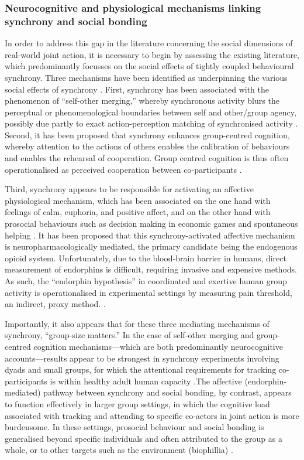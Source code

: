 \begin{CJK}{UTF8}{gbsn}
\subsubsection{Neurocognitive and physiological mechanisms linking synchrony and social bonding}
In order to address this gap in the literature concerning the social dimensions of real-world joint action, it is necessary to begin by assessing the existing literature, which predominantly focusses on the social effects of tightly coupled behavioural synchrony. Three mechanisms have been identified as underpinning the various social effects of synchrony \citep{Lang2017,Mogan2017}.  First, synchrony has been associated with the phenomenon of ``self-other merging,'' whereby synchronous activity blurs the perceptual or phenomenological boundaries between self and other/group agency, possibly due partly to exact action-perception matching of synchronised activity \citep{Hove2008}.  Second, it has been proposed that synchrony enhances group-centred cognition, whereby attention to the actions of others enables the calibration of behaviours and enables the rehearsal of cooperation. Group centred cognition is thus often operationalised as perceived cooperation between co-participants \citep{Reddish2013}.

Third, synchrony appears to be responsible for activating an affective physiological mechanism, which has been associated on the one hand with feelings of calm, euphoria, and positive affect, and on the other hand with prosocial behaviours such as decision making in economic games and spontaneous helping \citep{Wiltermuth2009,Reddish2013a,Mogan2017}.
It has been proposed that this synchrony-activated affective mechanism is neuropharmacologically mediated, the primary candidate being the endogenous opioid system.  Unfortunately, due to the blood-brain barrier in humans, direct measurement of endorphins is difficult, requiring invasive and expensive methods.  As such, the ``endorphin hypothesis'' in coordinated and exertive human group activity is operationalised in experimental settings by measuring pain threshold, an indirect, proxy method. \citep{Dunbar2008,Sullivan2013,Sullivan2014,Tarr2015}.

Importantly, it also appears that for these three mediating mechanisms of synchrony, ``group-size matters.'' In the case of self-other merging and group-centred cognition mechanisms---which are both predominantly neurocognitive accounts---results appear to be strongest in synchrony experiments involving dyads and small groups, for which the attentional requirements for tracking co-participants is within healthy adult human capacity \citep{Mogan2017}.The affective (endorphin-mediated) pathway between synchrony and social bonding, by contrast, appears to function effectively in larger group settings, in which the cognitive load associated with tracking and attending to specific co-actors in joint action is more burdensome.  In these settings, prosocial behaviour and social bonding is generalised beyond specific individuals and often attributed to the group as a whole, or to other targets such as the environment (biophillia) \citep{Reddish2013b, Reddish2016}.


\end{CJK}
